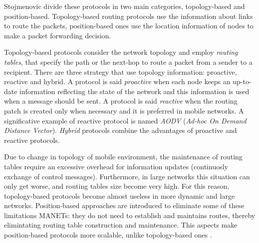 \documentclass[journal,comsoc]{IEEEtran}
\begin{document}
Stojmenovic \cite{stoj:position} divide these protocols in two main categories, topology-based and position-based. Topology-based routing protocols use the information about links to route the packets, position-based ones use the location information of nodes to make a packet forwarding decision.
\par Topology-based protocols consider the network topology and employ \emph{routing tables}, that specify the path or the next-hop to route a packet from a sender to a recipient. There are three strategy that use topology information: proactive, reactive and hybrid. A protocol is said \emph{proactive} when each node keeps an up-to-date information reflecting the state of the network and this information is used when a message should be sent. A protocol is said \emph{reactive} when the routing patch is created only when necessary and it is preferred in mobile networks. A significative example of reactive protocol is named \emph{AODV} (\emph{Ad-hoc On Demand Distance Vector}). \emph{Hybrid} protocols combine the advantages of proactive and reactive protocols.
\par Due to change in topology of mobile environment, the maintenance of routing tables require an excessive overhead for information updates (continuosly exchange of control messages). Furthermore, in large networks this situation can only get worse, and routing tables size become very high. For this reason, topology-based protocols become almost useless in more dynamic and large networks. Position-based approaches are introduced to eliminate some of these limitations MANETs: they do not need to establish and maintains routes, thereby elimintating routing table construction and maintenance. This aspects make position-based protocols more scalable, unlike topology-based ones \cite{li:scalable}.
\end{document}
